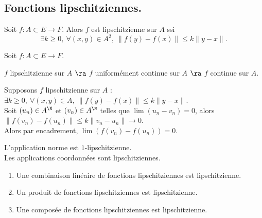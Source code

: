 \documentclass[11pt]{article}
\begin{document}
\vspace*{-0.7cm}

\subsection{Fonctions lipschitziennes.}

\begin{defi}{}{}
    Soit $f:A\subset E \to F$. Alors $f$ est lipschitzienne sur $A$ ssi
    \begin{equation*}
        \exists k \geq 0, ~ \forall (x,y) \in A^2, ~ \|f(y)-f(x)\| \leq k\|y-x\|.
    \end{equation*}
\end{defi}

\vspace*{-0.7cm}

\begin{prop}{}{}
    Soit $f:A\subset E \to F$.
    \begin{center}
        $f$ lipschitzienne sur $A$ $\ra$ $f$ uniformément continue sur $A$ $\ra$ $f$ continue sur $A$.
    \end{center}
    \tcblower
    Supposons $f$ lipschitzienne sur $A$ : $\exists k \geq 0, ~ \forall (x,y)\in A, ~ \|f(y)-f(x)\|\leq k\|y-x\|$.\\
    Soit $(u_n)\in A^\N$ et $(v_n)\in A^\N$ telles que $\lim(u_n-v_n)=0$, alors $\|f(v_n)-f(u_n)\|\leq k\|v_n - u_n\| \to 0$.\\
    Alors par encadrement, $\lim(f(v_n)-f(u_n))=0$.
\end{prop}

\vspace*{-0.7cm}

\begin{ex}{}{}
    L'application norme est $1$-lipschitzienne.\\
    Les applications coordonnées sont lipschitziennes.
\end{ex}

\vspace*{-0.7cm}

\begin{prop}{}{}
    \begin{enumerate}
        \item Une combinaison linéaire de fonctions lipschitziennes est lipschitzienne.
        \item Un produit de fonctions lipschitziennes est lipschitzienne.
        \item Une composée de fonctions lipschitziennes est lipschitzienne.
    \end{enumerate}
\end{prop}
\end{document}
